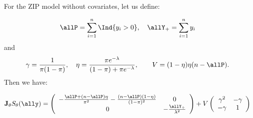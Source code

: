 \begin{proposition}\label{prop:AsympVarZIP}
 
  For the ZIP model without covariates, let us define: 
  
  $$\allP = \sum_{i=1}^n \Ind{y_i > 0},  \quad \allY_+ = \sum_{i=1}^n y_i$$ and 
  $$ 
   \gamma = \frac{1}{\pi(1-\pi)},\quad   \eta = \frac{\pi e^{-\lambda}}{(1-\pi) + \pi e^{-\lambda}}, \quad  \quad V = (1-\eta)\eta (n-\allP). $$ 
  Then we have: 
  
  $$\mathbf{J}_\theta  S_\theta(\ally) =  \left(
  \begin{array}{cc}
  -\frac{\allP + (n-\allP) \eta}{\pi^2} - \frac{(n-\allP)(1 - \eta)}{(1 - \pi)^2} & 0 \\
  0 & - \frac{\allY_+}{\lambda^2}
  \end{array}
  \right) 
  + V  \left(
  \begin{array}{cc}
  \gamma^2  & -\gamma    \\
  -\gamma  & 1 
  \end{array}
  \right)$$
  
\end{proposition}

